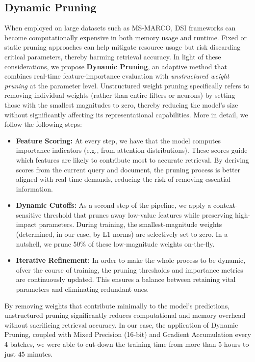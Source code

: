 \subsection{Dynamic Pruning}

When employed on large datasets such as MS-MARCO, DSI frameworks can become computationally expensive in both memory usage and runtime. Fixed or static pruning approaches can help mitigate resource usage but risk discarding critical parameters, thereby harming retrieval accuracy. In light of these considerations, we propose \textbf{Dynamic Pruning}, an adaptive method that combines real-time feature-importance evaluation with \textit{unstructured weight pruning} at the parameter level. Unstructured weight pruning specifically refers to removing individual weights (rather than entire filters or neurons) by setting those with the smallest magnitudes to zero, thereby reducing the model’s size without significantly affecting its representational capabilities. More in detail, we follow the following steps:
\begin{itemize}
    \item \textbf{Feature Scoring:} At every step, we have that the model computes importance indicators (e.g., from attention distributions). These scores guide which features are likely to contribute most to accurate retrieval. By deriving scores from the current query and document, the pruning process is better aligned with real-time demands, reducing the risk of removing essential information.
    \item \textbf{Dynamic Cutoffs:} As a second step of the pipeline, we apply a context-sensitive threshold that prunes away low-value features while preserving high-impact parameters. During training, the smallest-magnitude weights (determined, in our case, by L1 norms) are selectively set to zero. In a nutshell, we prune 50\% of these low-magnitude weights on-the-fly.
    \item \textbf{Iterative Refinement:} In order to make the whole process to be dynamic, ofver the course of training, the pruning thresholds and importance metrics are continuously updated. This ensures a balance between retaining vital parameters and eliminating redundant ones. 
\end{itemize}

By removing weights that contribute minimally to the model’s predictions, unstructured pruning significantly reduces computational and memory overhead without sacrificing retrieval accuracy. In our case, the application of Dynamic Pruning, coupled with Mixed Precision (16-bit) and Gradient Accumulation every 4 batches, we were able to cut-down the training time from more than 5 hours to just 45 minutes.  
